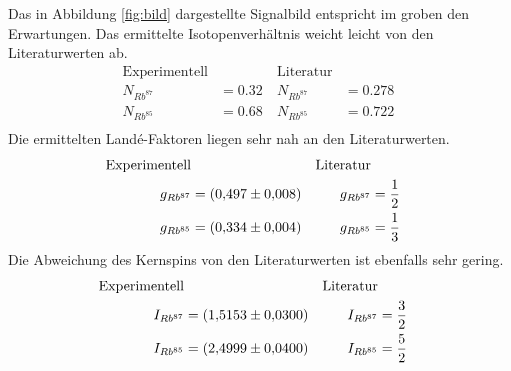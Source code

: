 Das in Abbildung \ref{fig:bild} dargestellte Signalbild entspricht im groben den Erwartungen.
Das ermittelte Isotopenverhältnis weicht leicht von den Literaturwerten ab.
\begin{align*}
  \text{Experimentell}&&\text{Literatur}\\
  N_{Rb^{87}}&=\SI{0,32}{}&N_{Rb^{87}}&=\SI{0,278}{}\\
  N_{Rb^{85}}&=\SI{0,68}{}&N_{Rb^{85}}&=\SI{0,722}{}\\
\end{align*}
Die ermittelten Landé-Faktoren liegen sehr nah an den Literaturwerten.
\begin{align*}
  \text{Experimentell}&&\text{Literatur}\\
  g_{Rb^{87}} &= \SI{0,497\pm0,008}{}&g_{Rb^{87}} &= \frac{1}{2}\\
  g_{Rb^{85}} &= \SI{0,334\pm0,004}{}&g_{Rb^{85}} &= \frac{1}{3}\\
\end{align*}
Die Abweichung des Kernspins von den Literaturwerten ist ebenfalls sehr gering.
\begin{align*}
  \text{Experimentell}&&\text{Literatur}\\
  I_{Rb^{87}}&=\SI{1,5153\pm0,03}{}&I_{Rb^{87}}&=\frac{3}{2}\\
  I_{Rb^{85}}&=\SI{2,4999\pm0,04}{}&I_{Rb^{85}}&=\frac{5}{2}\\
\end{align*}
